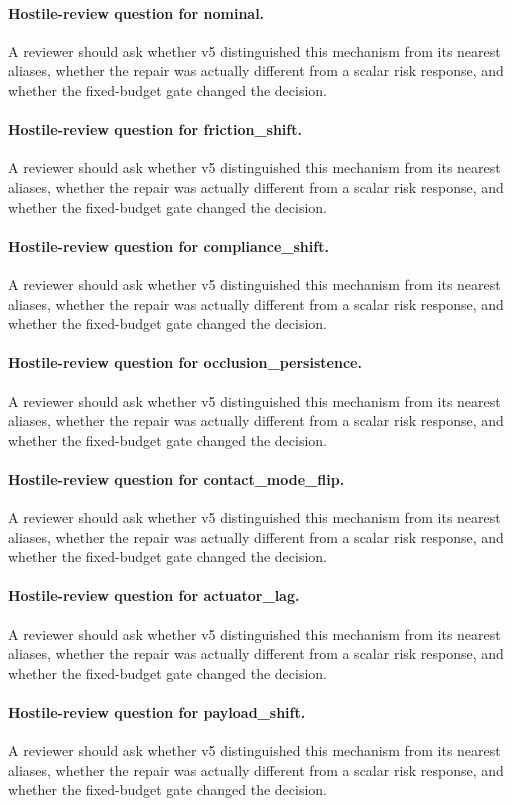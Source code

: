 \documentclass{article}
\begin{document}
\paragraph{Hostile-review question for nominal.} A reviewer should ask whether v5 distinguished this mechanism from its nearest aliases, whether the repair was actually different from a scalar risk response, and whether the fixed-budget gate changed the decision.
\paragraph{Hostile-review question for friction\_shift.} A reviewer should ask whether v5 distinguished this mechanism from its nearest aliases, whether the repair was actually different from a scalar risk response, and whether the fixed-budget gate changed the decision.
\paragraph{Hostile-review question for compliance\_shift.} A reviewer should ask whether v5 distinguished this mechanism from its nearest aliases, whether the repair was actually different from a scalar risk response, and whether the fixed-budget gate changed the decision.
\paragraph{Hostile-review question for occlusion\_persistence.} A reviewer should ask whether v5 distinguished this mechanism from its nearest aliases, whether the repair was actually different from a scalar risk response, and whether the fixed-budget gate changed the decision.
\paragraph{Hostile-review question for contact\_mode\_flip.} A reviewer should ask whether v5 distinguished this mechanism from its nearest aliases, whether the repair was actually different from a scalar risk response, and whether the fixed-budget gate changed the decision.
\paragraph{Hostile-review question for actuator\_lag.} A reviewer should ask whether v5 distinguished this mechanism from its nearest aliases, whether the repair was actually different from a scalar risk response, and whether the fixed-budget gate changed the decision.
\paragraph{Hostile-review question for payload\_shift.} A reviewer should ask whether v5 distinguished this mechanism from its nearest aliases, whether the repair was actually different from a scalar risk response, and whether the fixed-budget gate changed the decision.
\end{document}
